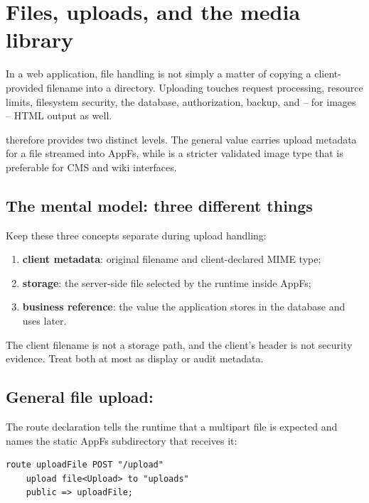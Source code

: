 \chapter{Files, uploads, and the media library}

In a web application, file handling is not simply a matter of copying a client-provided filename into a directory. Uploading touches request processing, resource limits, filesystem security, the database, authorization, backup, and -- for images -- HTML output as well.

\rwlang{} therefore provides two distinct levels. The general  value carries upload metadata for a file streamed into AppFs, while  is a stricter validated image type that is preferable for CMS and wiki interfaces.

\section{The mental model: three different things}

Keep these three concepts separate during upload handling:

\begin{enumerate}
  \item \textbf{client metadata}: original filename and client-declared MIME type;
  \item \textbf{storage}: the server-side file selected by the runtime inside AppFs;
  \item \textbf{business reference}: the value the application stores in the database and uses later.
\end{enumerate}

The client filename is not a storage path, and the client's  header is not security evidence. Treat both at most as display or audit metadata.

\section{General file upload: }

The route declaration tells the runtime that a multipart file is expected and names the static AppFs subdirectory that receives it:

\begin{lstlisting}[language=RWLang]
route uploadFile POST "/upload"
    upload file<Upload> to "uploads"
    public => uploadFile;
\end{lstlisting}

